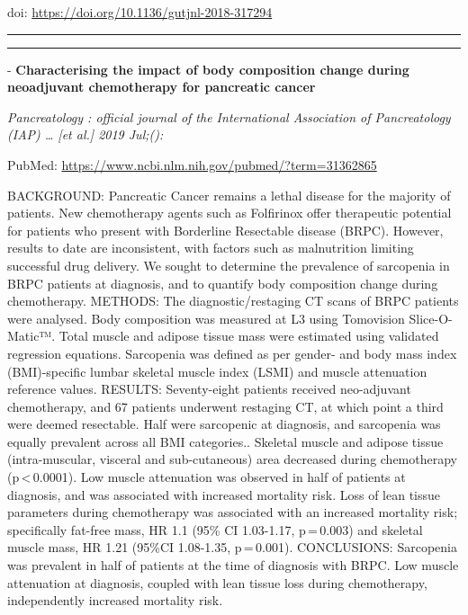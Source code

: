 \documentclass[]{article}
\begin{document}
doi: \url{https://doi.org/10.1136/gutjnl-2018-317294}

{}

{}

\begin{center}\rule{0.5\linewidth}{\linethickness}\end{center}

\begin{center}\rule{0.5\linewidth}{\linethickness}\end{center}

 - \textbf{Characterising the impact of body composition change during
neoadjuvant chemotherapy for pancreatic cancer}

\emph{Pancreatology : official journal of the International Association
of Pancreatology (IAP) \ldots{} {[}et al.{]} 2019 Jul;():}

PubMed: \url{https://www.ncbi.nlm.nih.gov/pubmed/?term=31362865}

BACKGROUND: Pancreatic Cancer remains a lethal disease for the majority
of patients. New chemotherapy agents such as Folfirinox offer
therapeutic potential for patients who present with Borderline
Resectable disease (BRPC). However, results to date are inconsistent,
with factors such as malnutrition limiting successful drug delivery. We
sought to determine the prevalence of sarcopenia in BRPC patients at
diagnosis, and to quantify body composition change during chemotherapy.
METHODS: The diagnostic/restaging CT scans of BRPC patients were
analysed. Body composition was measured at L3 using Tomovision
Slice-O-Matic™. Total muscle and adipose tissue mass were estimated
using validated regression equations. Sarcopenia was defined as per
gender- and body mass index (BMI)-specific lumbar skeletal muscle index
(LSMI) and muscle attenuation reference values. RESULTS: Seventy-eight
patients received neo-adjuvant chemotherapy, and 67 patients underwent
restaging CT, at which point a third were deemed resectable. Half were
sarcopenic at diagnosis, and sarcopenia was equally prevalent across all
BMI categories.. Skeletal muscle and adipose tissue (intra-muscular,
visceral and sub-cutaneous) area decreased during chemotherapy
(p\,\textless{}\,0.0001). Low muscle attenuation was observed in half of
patients at diagnosis, and was associated with increased mortality risk.
Loss of lean tissue parameters during chemotherapy was associated with
an increased mortality risk; specifically fat-free mass, HR 1.1 (95\% CI
1.03-1.17, p\,=\,0.003) and skeletal muscle mass, HR 1.21 (95\%CI
1.08-1.35, p\,=\,0.001). CONCLUSIONS: Sarcopenia was prevalent in half
of patients at the time of diagnosis with BRPC. Low muscle attenuation
at diagnosis, coupled with lean tissue loss during chemotherapy,
independently increased mortality risk.
\end{document}
